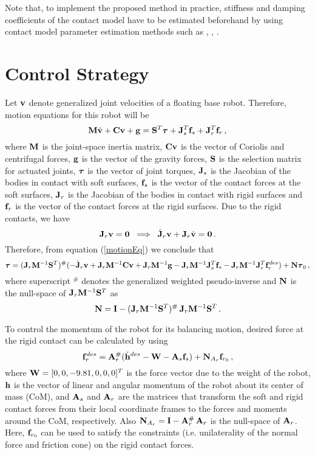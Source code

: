 \documentclass[a4paper, 11pt]{article}
\begin{document}
Note that, to implement the proposed method in practice, stiffness and damping
coefficients of the contact model have to be estimated beforehand by using
contact model parameter estimation methods such as \cite{Dallalietal13},
\cite{Diolaitietal05}, \cite{Ericksonetal03}.


\section{Control Strategy}
\label{control}

Let $\mathbf{v}$ denote generalized joint velocities of a floating base robot.
Therefore, motion equations for this robot will be
%
\begin{equation}
  \mathbf{M} \dot{\mathbf{v}} + \mathbf{C} \mathbf{v} + \mathbf{g} = \mathbf{S}^T \boldsymbol{\tau} + \mathbf{J}_s^T \mathbf{f}_s + \mathbf{J}_r^T \mathbf{f}_r
  \, ,
  \label{motionEq}
\end{equation}
%
where $\mathbf{M}$ is the joint-space inertia matrix, $\mathbf{C} \mathbf{v}$ is the vector of
Coriolis and centrifugal forces, $\mathbf{g}$ is the vector of the gravity forces,
$\mathbf{S}$ is the selection matrix for actuated joints, $\boldsymbol{\tau}$ is the vector of
joint torques, $\mathbf{J}_s$ is the Jacobian of the bodies in contact with soft
surfaces, $\mathbf{f}_s$ is the vector of the contact forces at the soft surfaces,
$\mathbf{J}_r$ is the Jacobian of the bodies in contact with rigid surfaces and
$\mathbf{f}_r$ is the vector of the contact forces at the rigid surfaces.  Due to the
rigid contacts, we have
%
\begin{equation}
  \mathbf{J}_r \mathbf{v} = \mathbf{0} \; \implies \; \dot{\mathbf{J}}_r \mathbf{v} + \mathbf{J}_r \dot{\mathbf{v}} = \mathbf{0}
  \, .
\end{equation}
%
Therefore, from equation (\ref{motionEq}) we conclude that
%
\begin{equation}
  \boldsymbol{\tau} = (\mathbf{J}_r \mathbf{M}^{-1} \mathbf{S}^T)^{\#}(-\dot{\mathbf{J}}_r \mathbf{v} + \mathbf{J}_r \mathbf{M}^{-1} \mathbf{C}
  \mathbf{v} + \mathbf{J}_r \mathbf{M}^{-1} \mathbf{g} - \mathbf{J}_r \mathbf{M}^{-1} \mathbf{J}_s^T \mathbf{f}_s - \mathbf{J}_r \mathbf{M}^{-1}
  \mathbf{J}_r^T \mathbf{f}_r^{des}) + \mathbf{N} \boldsymbol{\tau}_0 \, ,
  \label{taucalc}
\end{equation}
%
where superscript $^\#$ denotes the generalized weighted pseudo-inverse and
$\mathbf{N}$ is the null-space of $\mathbf{J}_r \mathbf{M}^{-1} \mathbf{S}^T$ as
%
\begin{equation}
  \mathbf{N} = \mathbf{I} - (\mathbf{J}_r \mathbf{M}^{-1} \mathbf{S}^T)^\# \, \mathbf{J}_r \mathbf{M}^{-1} \mathbf{S}^T \, .
\end{equation}
%

To control the momentum of the robot for its balancing motion, desired force
at the rigid contact can be calculated by using
%
\begin{equation}
  \mathbf{f}_r^{des} = \mathbf{A}_r^{\#} (\dot{\mathbf{h}}^{des} - \mathbf{W} - \mathbf{A}_s \mathbf{f}_s) + \mathbf{N}_{A_r}
  \mathbf{f}_{r_0} \, ,
  \label{frdes}
\end{equation}
%
where $\mathbf{W} = [0,0,-9.81,0,0,0]^T$ is the force vector due to the weight of the
robot, $\mathbf{h}$ is the vector of linear and angular momentum of the robot about
its center of mass (CoM), and $\mathbf{A}_s$ and $\mathbf{A}_r$ are the matrices that
transform the soft and rigid contact forces from their local coordinate frames
to the forces and moments around the CoM, respectively.  Also $\mathbf{N}_{A_r} = \mathbf{I}
- \mathbf{A}_r^\# \, \mathbf{A}_r$ is the null-space of $\mathbf{A}_r$.  Here, $\mathbf{f}_{r_0}$ can be
used to satisfy the constraints (i.e. unilaterality of the normal force and
friction cone) on the rigid contact forces.
\end{document}
